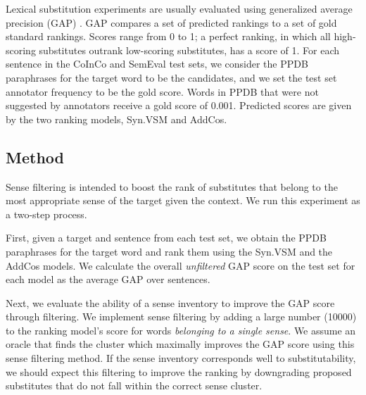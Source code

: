 \documentclass[11pt]{article}
\begin{document}

Lexical substitution experiments are usually evaluated using generalized average precision (GAP) \cite{kishida2005property}. GAP compares a set of predicted rankings to a set of gold standard rankings. Scores range from 0 to 1; a perfect ranking, in which all high-scoring substitutes outrank low-scoring substitutes, has a score of 1. For each sentence in the CoInCo and SemEval test sets, we consider the PPDB paraphrases for the target word to be the candidates, and we set the test set annotator frequency to be the gold score. Words in PPDB that were not suggested by annotators receive a gold score of 0.001. Predicted scores are given by the two ranking models, Syn.VSM and AddCos.

\subsection{Method}

Sense filtering is intended to boost the rank of substitutes that belong to the most appropriate sense of the target given the context. We run this experiment as a two-step process.

First, given a target and sentence from each test set, we obtain the PPDB paraphrases for the target word and rank them using the Syn.VSM and the AddCos models. We calculate the overall \textit{unfiltered} GAP score on the test set for each model as the average GAP over sentences.

Next, we evaluate the ability of a sense inventory to improve the GAP score through filtering. We implement sense filtering by adding a large number (10000) to the ranking model's score for words \textit{belonging to a single sense}. We assume an oracle that finds the cluster which maximally improves the GAP score using this sense filtering method. 
If the sense inventory corresponds well to substitutability, we should expect this filtering to improve the ranking by downgrading proposed substitutes that do not fall within the correct sense cluster.
\end{document}
